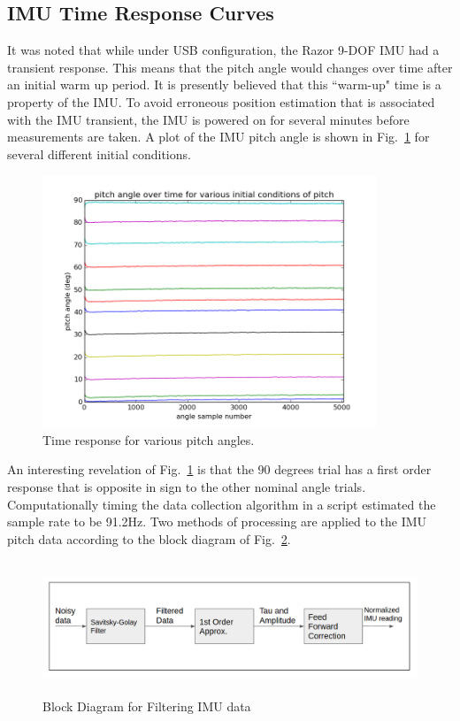\documentclass[12pt,a4paper]{book}
\begin{document}
\subsection{IMU Time Response Curves}
It was noted that while under USB configuration, the Razor 9-DOF IMU had a transient response.  This means that the pitch angle would changes over time after an initial warm up period. It is presently believed that this ``warm-up" time is a property of the IMU.  To avoid erroneous position estimation that is associated  with the IMU transient, the IMU is powered on for several minutes before measurements are taken.  A plot of the IMU pitch angle is shown in Fig.~\ref{f:manyPitchAngles} for several different initial conditions.
\begin{figure}[!ht]%
\centering
 \includegraphics[width=10cm]{manyPitchAngles.png}
 \caption{Time response for various pitch angles.}
 \label{f:manyPitchAngles}
\end{figure} 
An interesting revelation of Fig.~\ref{f:manyPitchAngles} is that the 90 degrees trial has a first order response that is opposite in sign to the other nominal angle trials.  Computationally timing the data collection algorithm in a script estimated the sample rate to be 91.2Hz.  Two methods of processing are applied to the IMU pitch data according to the block diagram of Fig.~\ref{f:filterblock}. 
\begin{figure}[!ht]%
\centering
 \includegraphics[height=4cm]{filterblock.png}
 \caption{Block Diagram for Filtering IMU data}
 \label{f:filterblock}
\end{figure} 
\end{document}
